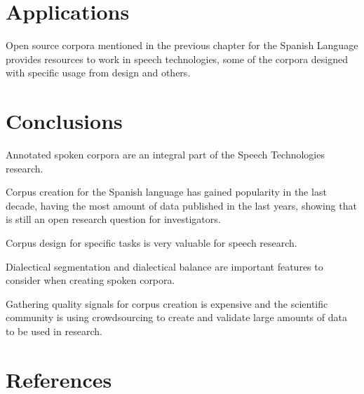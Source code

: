 \documentclass[10pt, a4paper]{article}
\begin{document}
\section{Applications}

Open source corpora mentioned in the previous chapter for the Spanish Language provides resources to work in speech technologies, some of the corpora designed with specific usage from design and others.

\section{Conclusions}

Annotated spoken corpora are an integral part of the Speech Technologies research.

Corpus creation for the Spanish language has gained popularity in the last decade, having the most amount of data published in the last years, showing that is still an open research question for investigators.

Corpus design for specific tasks is very valuable for speech research.

Dialectical segmentation and dialectical balance are important features to consider when creating spoken corpora.

Gathering quality signals for corpus creation is expensive and the scientific community is using crowdsourcing to create and validate large amounts of data to be used in research.

\section{References}



\end{document}
